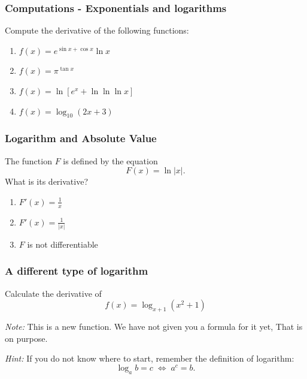 \documentclass[14pt]{beamer}
\begin{document}




	\begin{frame}[t]
		\frametitle{Computations - Exponentials and logarithms}

		Compute the derivative of the following functions:

		\begin{enumerate}
			\item $\displaystyle f(x) = e^{\sin x + \cos x}\ln x$
				\vfill

			\item $\displaystyle f(x) = \pi^{\tan x}$
				\vfill

			\item $\displaystyle f(x) = \ln \left[ e^{x}+ \ln \ln \ln x \right]$
				\vfill

			\item $\displaystyle f(x) = \log_{10}\left( 2x + 3 \right)$
				\vfill
		\end{enumerate}
	\end{frame}

	\begin{frame}[t]
		\frametitle{Logarithm and Absolute Value}

		The function $F$ is defined by the equation
		\[
			F(x) = \ln |x| .
		\]
		What is its derivative?
		\vfill
		\begin{enumerate}
			\item $\displaystyle F'(x) = \frac{1}{x}$
				\vfill

			\item $\displaystyle F'(x) = \frac{1}{|x|}$
				\vfill

			\item $F$ is not differentiable
				\vfill
		\end{enumerate}
	\end{frame}

	\begin{frame}[t]
		\frametitle{A different type of logarithm}

		Calculate the derivative of
		\[
			f(x) = \log_{x+1}(x^{2}+1)
		\]

		\vfill

		\emph{Note:} This is a new function. We have not given you a formula for it
		yet, That is on purpose.

		\vfill

		\emph{Hint:} If you do not know where to start, remember the definition of
		logarithm:
		\[
			\log_{a}b = c \; \iff \; a^{c}= b.
		\]
	\end{frame}
\end{document}
